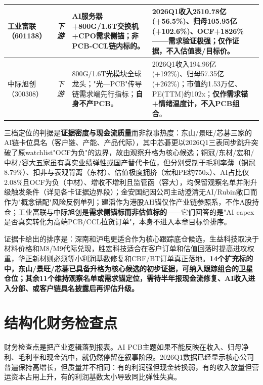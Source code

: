 \begin{exhibitbox}[图表6-2：产业链扩充标的短卡片]
\begin{tabularx}{\textwidth}{L{2.0cm}L{1.4cm}L{1.6cm}X L{1.9cm}}
\midrule
工业富联（601138） & \textit{下游} & AI服务器+800G/1.6T交换机+CPO需求侧锚；\textbf{非PCB-CCL链内标的}。 & 2026Q1收入2510.78亿(+56.5\%)、归母105.95亿(+102.6\%)、OCF+1826\%——需求验证极强；\textbf{仅作证据，不入估值表/目标价}。 &  \\
\midrule
中际旭创（300308） & \textit{下游} & 800G/1.6T光模块全球龙头；"光—PCB"传导链需求端先行指标；\textbf{自身不产PCB}。 & 2026Q1收入194.96亿(+192\%)、归母57.35亿(+262\%)；市值约1.53万亿、PE(TTM)约102x；\textbf{仅作需求锚+情绪温度计，不入PCB组合}。 &  \\
\bottomrule
\end{tabularx}
\end{exhibitbox}

三档定位的判据是\textbf{证据密度与现金流质量}而非叙事热度：东山/景旺/芯碁三家的AI链卡位具名（客户链、产能、产品代际），其中芯碁更以2026Q1三表同步跳升突破了原watchlist"OCF为负"的边界，故由观察升格为核心候选；铜冠/东材/宏和/中材/容大五家虽有真实业绩弹性或国产替代卡位，但分别受制于毛利率薄（铜冠8.79\%）、扣非与表观背离（东材）、估值极度拥挤（宏和PE约750x）、AI占比仅2.08\%且OCF为负（中材）、增收不增利且监管函（容大），均保留观察名单并附升级触发条件（详见各卡证据边界段）；金安国纪因公司主动澄清无AI/Rubin敞口而作为"概念错配"风险反例单列；建滔作为港股AH锚仅作产业链参照系，不作A股持仓；工业富联与中际旭创是\textbf{需求侧锚标而非估值标的}——它们回答的是"AI capex是否真实转化为高端PCB/CCL拉货订单"，本身不进入本章目标价排序。

证据卡给出的排序是：深南和沪电更适合作为核心跟踪底仓候选，生益科技取决于材料价格和M8/M9代际兑现，胜宏科技适合在客户订单和估值回落时提高进攻权重，华正新材则必须等小利润基数修复和CBF/BT订单真正落地。\textbf{14个扩充标的中，东山/景旺/芯碁已具备升格为核心候选的初步证据，可纳入跟踪组合的卫星仓位；其余11个维持观察名单或需求锚定位，需待半年报现金流修复、AI收入进入分部、或客户链具名披露后再评估升级。}

\section{结构化财务检查点}

财务检查点是把产业逻辑落到报表。AI PCB主题如果不能反映在收入、归母净利、毛利率和现金流中，就仍然停留在叙事阶段。2026Q1数据已经显示核心公司普遍保持高增长，但质量并不相同：有的利润强但现金转换弱，有的收入放量但营运资本占用上升，有的利润基数太小导致同比弹性失真。

